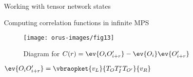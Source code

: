 \begin{frame}{Working with tensor network states}
\bi 
\item Computing correlation functions in infinite MPS
\ei 
\begin{figure}[t]
\centering
\texttt{[image: orus-images/fig13]}
%
\caption{Diagram for $C(r) = \ev{O_i O'_{i+r}}- \ev{O_i}\ev{O'_{i+r}}$}
\end{figure}
\bi 
\item  $\ev{O_i O'_{i+r}} = \vbraopket{v_L}{T_O T_I^r T_{O'}}{v_R}$
\ei 
\end{frame}